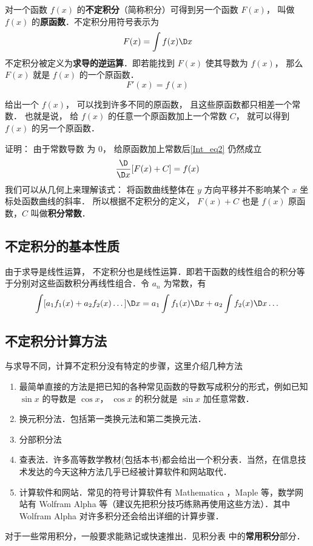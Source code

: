
对一个函数 $f(x)$ 的\textbf{不定积分}（简称积分）可得到另一个函数 $F(x)$， 叫做 $f(x)$ 的\textbf{原函数}．不定积分用符号表示为
\begin{equation}\label{Int_eq1}
F(x) = \int {f(x)\D x} 
\end{equation}
不定积分被定义为\textbf{求导的逆运算}．即若能找到 $F(x)$ 使其导数为 $f(x)$， 那么 $F(x)$ 就是  $f(x)$ 的一个原函数．
\begin{equation}\label{Int_eq2}
F'(x) = f(x)
\end{equation}

给出一个 $f(x)$， 可以找到许多不同的原函数， 且这些原函数都只相差一个常数． 也就是说， 给 $f(x)$ 的任意一个原函数加上一个常数 $C$， 就可以得到 $f(x)$ 的另一个原函数． 

证明： 由于常数导数%
为 $0$， 给原函数加上常数后\autoref{Int_eq2} 仍然成立
\begin{equation}\label{Int_eq3}
\frac{\D}{\D x}[F(x) + C] = f(x)
\end{equation}
我们可以从几何上来理解该式： 将函数曲线整体在 $y$ 方向平移并不影响某个 $x$ 坐标处函数曲线的斜率．
所以根据不定积分的定义， $F(x) + C$ 也是 $f(x)$ 原函数，$C$ 叫做\textbf{积分常数}．

\subsection{不定积分的基本性质}%

由于求导是线性运算，%
不定积分也是线性运算．即若干函数的线性组合的积分等于分别对这些函数积分再线性组合．令 $a_n$ 为常数，有
\begin{equation}\label{Int_eq4}
\int [a_1 f_1(x) + a_2 f_2(x)\dots]\D x  = a_1 \int {f_1(x)\D x} + a_2 \int {f_2(x)\D x} \dots
\end{equation}

\subsection{不定积分计算方法}
与求导不同，计算不定积分没有特定的步骤，这里介绍几种方法
\begin{enumerate}
\item 最简单直接的方法是把已知的各种常见函数的导数写成积分的形式，例如已知 $\sin x$ 的导数是 $\cos x$， $\cos x$ 的积分就是 $\sin x$ 加任意常数．
\item 换元积分法．包括第一类换元法和第二类换元法．

\item 分部积分法%

\item 查表法．许多高等数学教材(包括本书)都会给出一个积分表．当然，在信息技术发达的今天这种方法几乎已经被计算软件和网站取代．

\item 计算软件和网站．常见的符号计算软件有 Mathematica %
，Maple 等，数学网站有 Wolfram Alpha %
等（建议先把积分技巧练熟再使用这些方法）．其中 Wolfram Alpha 对许多积分还会给出详细的计算步骤．
 \end{enumerate}


对于一些常用积分，一般要求能熟记或快速推出．见积分表 中的\textbf{常用积分}部分．%



